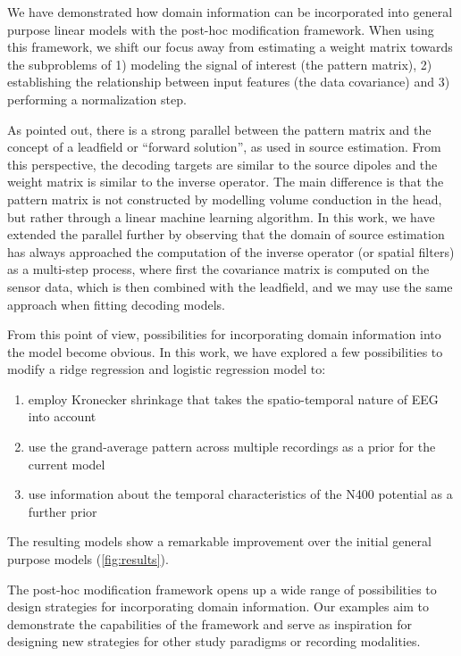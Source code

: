 \documentclass[a4paper]{vanvliet_paper}
\begin{document}
We have demonstrated how domain information can be incorporated into general purpose linear models with the post-hoc modification framework.
When using this framework, we shift our focus away from estimating a weight matrix towards the subproblems of 1) modeling the signal of interest (the pattern matrix), 2) establishing the relationship between input features (the data covariance) and 3) performing a normalization step.

As \textcite{Haufe2014} pointed out, there is a strong parallel between the pattern matrix and the concept of a leadfield or ``forward solution'', as used in source estimation\cite{Hamalainen1993}.
From this perspective, the decoding targets are similar to the source dipoles and the weight matrix is similar to the inverse operator.
The main difference is that the pattern matrix is not constructed by modelling volume conduction in the head, but rather through a linear machine learning algorithm.
In this work, we have extended the parallel further by observing that the domain of source estimation has always approached the computation of the inverse operator (or spatial filters) as a multi-step process, where first the covariance matrix is computed on the sensor data, which is then combined with the leadfield\cite{Hamalainen1993, Sekihara2008}, and we may use the same approach when fitting decoding models.

From this point of view, possibilities for incorporating domain information into the model become obvious.
In this work, we have explored a few possibilities to modify a ridge regression and logistic regression model to:
\begin{enumerate}
    \item employ Kronecker shrinkage that takes the spatio-temporal nature of \gls{EEG} into account
    \item use the grand-average pattern across multiple recordings as a prior for the current model
    \item use information about the temporal characteristics of the N400 potential as a further prior
\end{enumerate}
The resulting models show a remarkable improvement over the initial general purpose models (\autoref{fig:results}).

The post-hoc modification framework opens up a wide range of possibilities to design strategies for incorporating domain information.
Our examples aim to demonstrate the capabilities of the framework and serve as inspiration for designing new strategies for other study paradigms or recording modalities.
\end{document}
